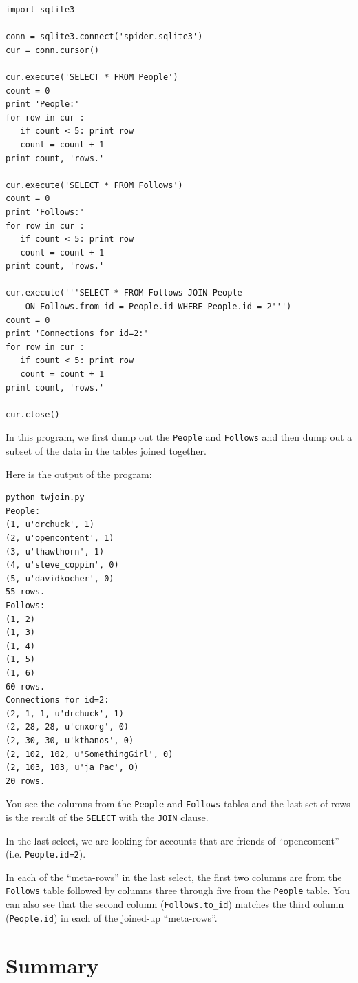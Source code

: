 \documentclass[11pt]{book}
\begin{document}
\beforeverb
\begin{verbatim}
import sqlite3

conn = sqlite3.connect('spider.sqlite3')
cur = conn.cursor()

cur.execute('SELECT * FROM People')
count = 0
print 'People:'
for row in cur :
   if count < 5: print row
   count = count + 1
print count, 'rows.'

cur.execute('SELECT * FROM Follows')
count = 0
print 'Follows:'
for row in cur :
   if count < 5: print row
   count = count + 1
print count, 'rows.'

cur.execute('''SELECT * FROM Follows JOIN People 
    ON Follows.from_id = People.id WHERE People.id = 2''')
count = 0
print 'Connections for id=2:'
for row in cur :
   if count < 5: print row
   count = count + 1
print count, 'rows.'

cur.close()
\end{verbatim}
\afterverb
%
In this program, we first dump out the {\tt People}
and {\tt Follows} and then dump out a subset of the
data in the tables joined together.

Here is the output of the program:

\beforeverb
\begin{verbatim}
python twjoin.py 
People:
(1, u'drchuck', 1)
(2, u'opencontent', 1)
(3, u'lhawthorn', 1)
(4, u'steve_coppin', 0)
(5, u'davidkocher', 0)
55 rows.
Follows:
(1, 2)
(1, 3)
(1, 4)
(1, 5)
(1, 6)
60 rows.
Connections for id=2:
(2, 1, 1, u'drchuck', 1)
(2, 28, 28, u'cnxorg', 0)
(2, 30, 30, u'kthanos', 0)
(2, 102, 102, u'SomethingGirl', 0)
(2, 103, 103, u'ja_Pac', 0)
20 rows.
\end{verbatim}
\afterverb
%
You see the columns from the {\tt People} and {\tt Follows} tables and the last
set of rows is the result of the {\tt SELECT} with the {\tt JOIN} clause.

In the last select, we are looking for accounts that are friends of 
``opencontent'' (i.e. {\tt People.id=2}).

In each of the ``meta-rows'' in the last select, the first two columns are
from the {\tt Follows}
table followed by columns three through five from the {\tt People} table.  You can also
see that the second column (\verb"Follows.to_id") matches the third column
({\tt People.id}) in each of the joined-up ``meta-rows''.

\section{Summary}
\end{document}
